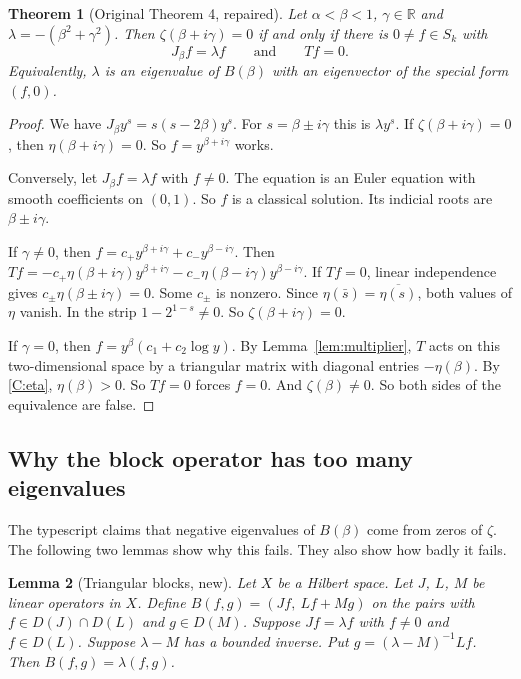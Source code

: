 \documentclass[12pt,letterpaper]{article}
\newtheorem{theorem}{Theorem}[section]
\newtheorem{lemma}[theorem]{Lemma}
\theoremstyle{definition}
\theoremstyle{remark}
\newcommand{\RR}{\mathbb{R}}
\begin{document}
\begin{theorem}[Original Theorem 4, repaired]\label{thm:spectral}
Let $\alpha<\beta<1$, $\gamma\in\RR$ and $\lambda=-(\beta^2+\gamma^2)$.
Then $\zeta(\beta+i\gamma)=0$ if and only if there is $0\ne f\in S_k$ with
\[
J_\beta f=\lambda f\qquad\text{and}\qquad Tf=0.
\]
Equivalently, $\lambda$ is an eigenvalue of $B(\beta)$ with an
eigenvector of the special form $(f,0)$.
\end{theorem}

\begin{proof}
We have $J_\beta y^s=s(s-2\beta)y^s$. For $s=\beta\pm i\gamma$ this is
$\lambda y^s$. If $\zeta(\beta+i\gamma)=0$, then $\eta(\beta+i\gamma)=0$.
So $f=y^{\beta+i\gamma}$ works.

Conversely, let $J_\beta f=\lambda f$ with $f\ne0$. The equation is an
Euler equation with smooth coefficients on $(0,1)$. So $f$ is a classical
solution. Its indicial roots are $\beta\pm i\gamma$.

If $\gamma\ne0$, then $f=c_+y^{\beta+i\gamma}+c_-y^{\beta-i\gamma}$. Then
$Tf=-c_+\eta(\beta+i\gamma)y^{\beta+i\gamma}-c_-\eta(\beta-i\gamma)
y^{\beta-i\gamma}$. If $Tf=0$, linear independence gives
$c_\pm\eta(\beta\pm i\gamma)=0$. Some $c_\pm$ is nonzero. Since
$\eta(\bar s)=\overline{\eta(s)}$, both values of $\eta$ vanish. In the
strip $1-2^{1-s}\ne0$. So $\zeta(\beta+i\gamma)=0$.

If $\gamma=0$, then $f=y^\beta(c_1+c_2\log y)$. By
Lemma~\ref{lem:multiplier}, $T$ acts on this two-dimensional space by a
triangular matrix with diagonal entries $-\eta(\beta)$. By \ref{C:eta},
$\eta(\beta)>0$. So $Tf=0$ forces $f=0$. And $\zeta(\beta)\ne0$. So both
sides of the equivalence are false.
\end{proof}

\subsection{Why the block operator has too many eigenvalues}

The typescript claims that negative eigenvalues of $B(\beta)$ come from
zeros of $\zeta$. The following two lemmas show why this fails. They also
show how badly it fails.

\begin{lemma}[Triangular blocks, new]\label{lem:triangular}
Let $X$ be a Hilbert space. Let $J$, $L$, $M$ be linear operators in $X$.
Define $B(f,g)=(Jf,\ Lf+Mg)$ on the pairs with $f\in D(J)\cap D(L)$ and
$g\in D(M)$. Suppose $Jf=\lambda f$ with $f\ne0$ and $f\in D(L)$. Suppose
$\lambda-M$ has a bounded inverse. Put $g=(\lambda-M)^{-1}Lf$. Then
$B(f,g)=\lambda(f,g)$.
\end{lemma}
\end{document}
